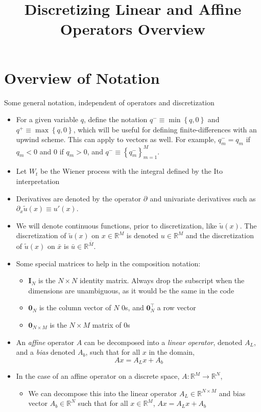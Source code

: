 \documentclass[11pt]{article}
\newcommand{\set}[1]{\ensuremath{\left\{{#1}\right\}}}
\newcommand{\R}{\ensuremath{\mathbb{R}}}
\newcommand{\D}[1][]{\ensuremath{\partial_{#1}}}
\begin{document}
	\title{Discretizing Linear and Affine Operators Overview}
	\author{}
	\date{}
	\maketitle
	\section{Overview of Notation}
	Some general notation, independent of operators and discretization
	\begin{itemize}
		\item For a given variable $q$, define the notation $q^{-} \equiv \min\set{q,0}$ and $q^{+} \equiv \max\set{q,0}$, which will be useful for defining finite-differences with an upwind scheme.  This can apply to vectors as well. For example, $q_m^{-} = q_m$ if $q_m < 0$ and $0$ if $q_m > 0$, and $q^{-} \equiv \set{q^{-}_m}_{m=1}^{M}$.
		\item Let $W_t$ be the Wiener process with the integral defined by the Ito interpretation
		\item Derivatives are denoted by the operator $\D$ and univariate derivatives such as $\D[x]\tilde{u}(x) \equiv u'(x)$.
		\item We will denote continuous functions, prior to discretization, like $\tilde{u}(x)$.  The discretization of $\tilde{u}(x)$ on $x\in \R^M$ is denoted $u \in \R^M$ and the discretization of $\tilde{u}(x)$ on $\bar{x}$ is $\bar{u} \in \R^{\bar{M}}$.
		\item Some special matrices to help in the composition notation:
		\begin{itemize}
			\item $\mathbf{I}_N$ is the $N\times N$ identity matrix.  Always drop the subscript when the dimensions are unambiguous, as it would be the same in the code
			\item $\mathbf{0}_N$ is the column vector of $N$ $0$s, and $\mathbf{0}_N^{\top}$ a row vector
			\item $\mathbf{0}_{N\times M}$ is the $N\times M$ matrix of $0$s
		\end{itemize}
  	\item An \textit{affine} operator $A$ can be decomposed into a \textit{linear operator}, denoted $A_L$, and a \textit{bias} denoted $A_b$, such that for all $x$ in the domain,
		$$
		A x = A_L x + A_b
		$$
		\item In the case of an affine operator on a discrete space, $A : \R^M \to \R^N$,
		\begin{itemize}
			\item We can decompose this into the linear operator $A_L \in \R^{N\times M}$ and bias vector $A_b \in \R^{N}$ such that for all $x\in\R^M$, $A x = A_L x + A_b$
		\end{itemize}
	\end{itemize}
\end{document}
